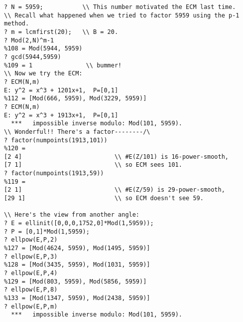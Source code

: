 \documentclass[11pt]{report}
\begin{document}
\begin{verbatim}
? N = 5959;           \\ This number motivated the ECM last time.
\\ Recall what happened when we tried to factor 5959 using the p-1 method.
? m = lcmfirst(20);   \\ B = 20.
? Mod(2,N)^m-1
%108 = Mod(5944, 5959)
? gcd(5944,5959)
%109 = 1               \\ bummer!
\\ Now we try the ECM:
? ECM(N,m)
E: y^2 = x^3 + 1201x+1,  P=[0,1]
%112 = [Mod(666, 5959), Mod(3229, 5959)]
? ECM(N,m)
E: y^2 = x^3 + 1913x+1,  P=[0,1]
  ***   impossible inverse modulo: Mod(101, 5959).
\\ Wonderful!! There's a factor--------/\
? factor(numpoints(1913,101))
%120 =
[2 4]                          \\ #E(Z/101) is 16-power-smooth, 
[7 1]                          \\ so ECM sees 101.
? factor(numpoints(1913,59))
%119 =
[2 1]                          \\ #E(Z/59) is 29-power-smooth,
[29 1]                         \\ so ECM doesn't see 59.

\\ Here's the view from another angle:
? E = ellinit([0,0,0,1752,0]*Mod(1,5959));
? P = [0,1]*Mod(1,5959);
? ellpow(E,P,2)
%127 = [Mod(4624, 5959), Mod(1495, 5959)]
? ellpow(E,P,3)
%128 = [Mod(3435, 5959), Mod(1031, 5959)]
? ellpow(E,P,4)
%129 = [Mod(803, 5959), Mod(5856, 5959)]
? ellpow(E,P,8)
%133 = [Mod(1347, 5959), Mod(2438, 5959)]
? ellpow(E,P,m)
  ***   impossible inverse modulo: Mod(101, 5959).
\end{verbatim}
\end{document}
